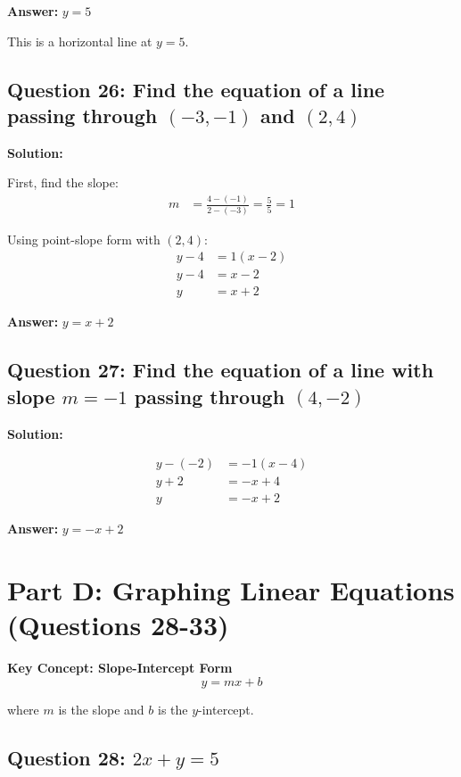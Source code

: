 \documentclass[12pt]{article}
\begin{document}
\textbf{Answer: } $y = 5$

This is a horizontal line at $y = 5$.

\vspace{0.3cm}

\subsection*{Question 26: Find the equation of a line passing through $(-3, -1)$ and $(2, 4)$}

\noindent\textbf{Solution:}

First, find the slope:
\begin{align*}
m &= \frac{4 - (-1)}{2 - (-3)} = \frac{5}{5} = 1
\end{align*}

Using point-slope form with $(2, 4)$:
\begin{align*}
y - 4 &= 1(x - 2) \\
y - 4 &= x - 2 \\
y &= x + 2
\end{align*}

\textbf{Answer: } $y = x + 2$

\vspace{0.3cm}

\subsection*{Question 27: Find the equation of a line with slope $m = -1$ passing through $(4, -2)$}

\noindent\textbf{Solution:}

\begin{align*}
y - (-2) &= -1(x - 4) \\
y + 2 &= -x + 4 \\
y &= -x + 2
\end{align*}

\textbf{Answer: } $y = -x + 2$

\newpage

\section{Part D: Graphing Linear Equations (Questions 28-33)}

\textbf{Key Concept: Slope-Intercept Form}
$$y = mx + b$$

where $m$ is the slope and $b$ is the $y$-intercept.

\subsection*{Question 28: $2x + y = 5$}
\end{document}
